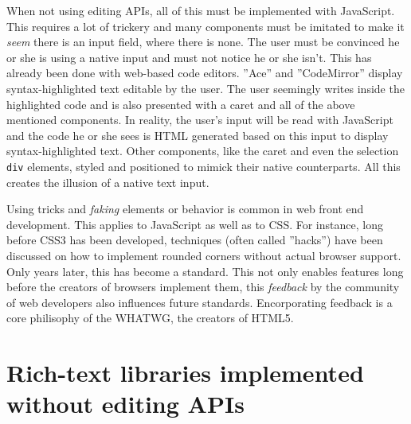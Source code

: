 When not using editing APIs, all of this must be implemented with JavaScript. This requires a lot of trickery and many components must be imitated to make it \textit{seem} there is an input field, where there is none. The user must be convinced he or she is using a native input and must not notice he or she isn't. This has already been done with web-based code editors. ''Ace'' and ''CodeMirror'' display syntax-highlighted text editable by the user. The user seemingly writes inside the highlighted code and is also presented with a caret and all of the above mentioned components. In reality, the user's input will be read with JavaScript and the code he or she sees is HTML generated based on this input to display syntax-highlighted text. Other components, like the caret and even the selection \texttt{div} elements, styled and positioned to mimick their native counterparts. All this creates the illusion of a native text input.


Using tricks and \textit{faking} elements or behavior is common in web front end development. This applies to JavaScript as well as to CSS. For instance, long before CSS3 has been developed, techniques (often called ''hacks'') have been discussed on how to implement rounded corners without actual browser support. Only years later, this has become a standard. This not only enables features long before the creators of browsers implement them, this \textit{feedback} by the community of web developers also influences future standards. Encorporating feedback is a core philisophy of the WHATWG, the creators of HTML5.


\section{Rich-text libraries implemented without editing APIs}

